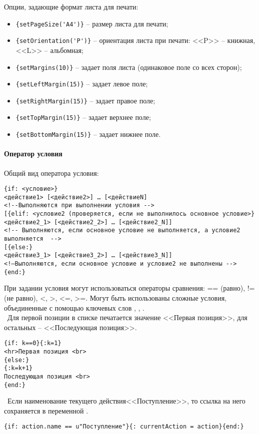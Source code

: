 Опции, задающие формат листа для печати:
\begin{itemize}
 \item \verb|{setPageSize('A4')}| – размер листа для печати;
 \item \verb|{setOrientation('P')}| – ориентация листа при печати: <<P>> – книжная, <<L>> – альбомная;
 \item \verb|{setMargins(10)}| – задает поля листа (одинаковое поле со всех сторон);
 \item \verb|{setLeftMargin(15)}| – задает левое поле;
 \item \verb|{setRightMargin(15)}| – задает правое поле;
 \item \verb|{setTopMargin(15)}| – задает верхнее поле;
 \item \verb|{setBottomMargin(15)}| – задает нижнее поле.
\end{itemize}

\paragraph{Оператор условия}

Общий вид оператора условия: 
\begin{verbatim}
{if: <условие>} 
<действие1> [<действие2>] … [<действиеN]
<!--Выполняются при выполнении условия --> 
[{elif: <условие2 (проверяется, если не выполнилось основное условие>} 
<действие2_1> [<действие2_2>] … [<действие2_N]] 		
<!-- Выполняются, если основное условие не выполняется, а условие2 выполняется  --> 
[{else:} 
<действие3_1> [<действие3_2>] … [<действие3_N]] 	
<!—Выполняются, если основное условие и условие2 не выполнены --> 
{end:} 
\end{verbatim}

При задании условия могут использоваться операторы сравнения: == (равно), != (не равно), <, >, <=, >=. Могут быть использованы сложные условия, объединенные с помощью ключевых слов , , . \\

 ~Для первой позиции в списке печатается значение <<Первая позиция>>, для остальных – <<Последующая позиция>>.
\begin{verbatim}
{if: k==0}{:k=1} 
<hr>Первая позиция <br>
{else:}
{:k=k+1}
Последующая позиция <br>
{end:}
\end{verbatim}

 ~Если наименование текущего действия<<Поступление>>, то ссылка на него сохраняется в переменной .
\begin{verbatim}
{if: action.name == u"Поступление"}{: currentAction = action}{end:}
\end{verbatim}

